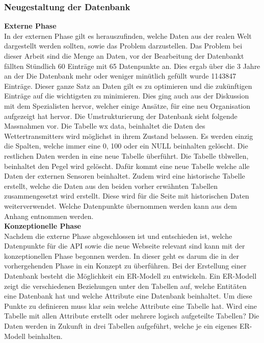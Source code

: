 \subsubsection{Neugestaltung der Datenbank}
\textbf{Externe Phase}\\
In der externen Phase gilt es herauszufinden, welche Daten aus der realen Welt dargestellt werden sollten, sowie das Problem darzustellen. Das Problem bei dieser Arbeit sind die Menge an Daten, vor der Bearbeitung der Datenbankt fällten Stündlich 60 Einträge mit 65 Datenpunkte an. Dies ergab über die 3 Jahre an der Die Datenbank mehr oder weniger minütlich gefüllt wurde 1143847 Einträge. Dieser ganze Satz an Daten gilt es zu optimieren und die zukünftigen Einträge auf die wichtigsten zu minimieren. Dies ging auch aus der Diskussion mit dem Spezialisten hervor, welcher einige Ansätze, für eine neu Organisation aufgezeigt hat hervor. Die Umstrukturierung der Datenbank sieht folgende Massnahmen vor. Die Tabelle wx data, beinhaltet die Daten des Wettertransmitters wird möglichst in ihrem Zustand belassen. Es werden einzig die Spalten, welche immer eine 0, 100 oder ein NULL beinhalten gelöscht. Die restlichen Daten werden in eine neue Tabelle überführt. Die Tabelle tblwellen, beinhaltet den Pegel wird gelöscht. Dafür kommt eine neue Tabelle welche alle Daten der externen Sensoren beinhaltet. Zudem wird eine historische Tabelle erstellt, welche die Daten aus den beiden vorher erwähnten Tabellen zusammengesetzt wird erstellt. Diese wird für die Seite mit historischen Daten weiterverwendet. Welche Datenpunkte übernommen werden kann aus dem Anhang  entnommen werden.\\

\textbf{Konzeptionelle Phase}\\
Nachdem die externe Phase abgeschlossen ist und entschieden ist, welche Datenpunkte für die API sowie die neue Webseite relevant sind kann mit der konzeptionellen Phase begonnen werden. In dieser geht es darum die in der vorhergehenden Phase in ein Konzept zu überführen. Bei der Erstellung einer Datenbank besteht die Möglichkeit ein ER-Modell zu entwickeln. Ein ER-Modell zeigt die verschiedenen Beziehungen unter den Tabellen auf, welche Entitäten eine Datenbank hat und welche Attribute eine Datenbank beinhaltet.\cite{FrankGeisler2011mitpu} Um diese Punkte zu definieren muss klar sein welche Attribute eine Tabelle hat. Wird eine Tabelle mit allen Attribute erstellt oder mehrere logisch aufgeteilte Tabellen? Die Daten werden in Zukunft in drei Tabellen aufgeführt, welche je ein eigenes ER-Modell beinhalten.\\

